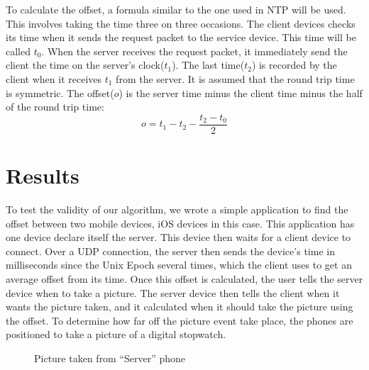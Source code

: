 \documentclass[10pt]{IEEEtran}
\begin{document}
To calculate the offset, a formula similar to the one used in NTP will be used.
This involves taking the time three on three occasions. The client devices
checks its time when it sends the request packet to the service device. This
time will be called $t_0$. When the server receives the request packet, it
immediately send the client the time on the server's clock($t_1$). The last
time($t_2$) is recorded by the client when it receives $t_1$ from the server. 
It is assumed that the round trip time is symmetric. The offset($o$) is the
server time minus the client time minus the half of the round trip time:
\begin{equation}
    o = t_1 - t_2 - \frac{t_2 - t_0}{2} 
\end{equation}

\section{Results}

To test the validity of our algorithm, we wrote a simple application to find 
the offset between two mobile devices, iOS devices in this case. This
application has one device declare itself the server. This device then waits for
a client device to connect. Over a UDP connection, the server then sends the
device's time in milliseconds since the Unix Epoch several times, which the
client uses to get an average offset from its time. Once this offset is
calculated, the user tells the server device when to take a picture. The server
device then tells the client when it wants the picture taken, and it calculated
when it should take the picture using the offset. To determine how far off the
picture event take place, the phones are positioned to take a picture of a
digital stopwatch.

\begin{figure}
{}
\caption{Picture taken from ``Server'' phone}
\label{fig:pic0}
\end{figure}
\end{document}
